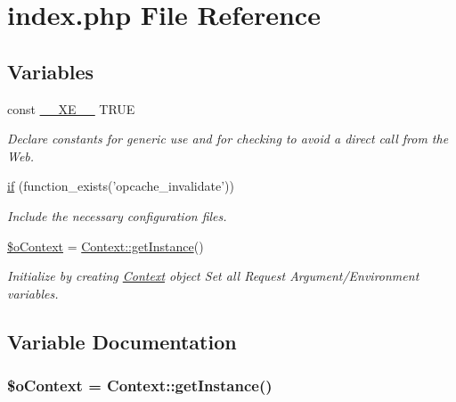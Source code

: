 \hypertarget{index_8php}{\section{index.\-php File Reference}
\label{index_8php}
}
\subsection*{Variables}
\begin{DoxyCompactItemize}
\item 
const \hyperlink{index_8php_a697de427d83b791899ae45d555377756}{\-\_\-\-\_\-\-X\-E\-\_\-\-\_\-} T\-R\-U\-E
\begin{DoxyCompactList}\small\item\em Declare constants for generic use and for checking to avoid a direct call from the Web. \end{DoxyCompactList}\item 
\hyperlink{index_8php_a89c9c4ffebb12a316e28d000a981cf89}{if} (function\-\_\-exists('opcache\-\_\-invalidate'))
\begin{DoxyCompactList}\small\item\em Include the necessary configuration files. \end{DoxyCompactList}\item 
\hyperlink{index_8php_aacfc569bef069a536ba65859b245068b}{\$o\-Context} = \hyperlink{classContext_a399e419617c7fe9b0c9eaf22c431df69}{Context\-::get\-Instance}()
\begin{DoxyCompactList}\small\item\em Initialize by creating \hyperlink{classContext}{Context} object Set all Request Argument/\-Environment variables. \end{DoxyCompactList}\end{DoxyCompactItemize}


\subsection{Variable Documentation}
\hypertarget{index_8php_aacfc569bef069a536ba65859b245068b}{
\subsubsection[{\$o\-Context}]{\setlength{\rightskip}{0pt plus 5cm}\$o\-Context = {\bf Context\-::get\-Instance}()}}\label{index_8php_aacfc569bef069a536ba65859b245068b}


